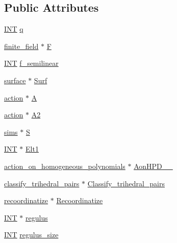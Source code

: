 \subsection*{Public Attributes}
\begin{DoxyCompactItemize}
\item 
\mbox{\hyperlink{galois_8h_a09fddde158a3a20bd2dcadb609de11dc}{I\+NT}} \mbox{\hyperlink{classsurface__with__action_ad76c0d129cee128327c4eb84b0943255}{q}}
\item 
\mbox{\hyperlink{classfinite__field}{finite\+\_\+field}} $\ast$ \mbox{\hyperlink{classsurface__with__action_ad9387d832b50fbcb93ca2cb84eec30a8}{F}}
\item 
\mbox{\hyperlink{galois_8h_a09fddde158a3a20bd2dcadb609de11dc}{I\+NT}} \mbox{\hyperlink{classsurface__with__action_a292234b69668cc2b04a3748a07d655fa}{f\+\_\+semilinear}}
\item 
\mbox{\hyperlink{classsurface}{surface}} $\ast$ \mbox{\hyperlink{classsurface__with__action_a28f1189bfbd4aeca4a38ea6e8dffdecc}{Surf}}
\item 
\mbox{\hyperlink{classaction}{action}} $\ast$ \mbox{\hyperlink{classsurface__with__action_a917c39611aca53009efb0cba5067de16}{A}}
\item 
\mbox{\hyperlink{classaction}{action}} $\ast$ \mbox{\hyperlink{classsurface__with__action_a3f56e203b7c502c7444cd3a25e43307f}{A2}}
\item 
\mbox{\hyperlink{classsims}{sims}} $\ast$ \mbox{\hyperlink{classsurface__with__action_aae9cc463b8b45bc730b746d2418c00a4}{S}}
\item 
\mbox{\hyperlink{galois_8h_a09fddde158a3a20bd2dcadb609de11dc}{I\+NT}} $\ast$ \mbox{\hyperlink{classsurface__with__action_a48da49b4e4eb51b1b23f5ac625dd772e}{Elt1}}
\item 
\mbox{\hyperlink{classaction__on__homogeneous__polynomials}{action\+\_\+on\+\_\+homogeneous\+\_\+polynomials}} $\ast$ \mbox{\hyperlink{classsurface__with__action_a7d9807f03ad5ae4f52d311daf339519b}{Aon\+H\+P\+D\+\_\+\_}}
\item 
\mbox{\hyperlink{classclassify__trihedral__pairs}{classify\+\_\+trihedral\+\_\+pairs}} $\ast$ \mbox{\hyperlink{classsurface__with__action_aa3df02c272e3f7e0ea2ae774a335927a}{Classify\+\_\+trihedral\+\_\+pairs}}
\item 
\mbox{\hyperlink{classrecoordinatize}{recoordinatize}} $\ast$ \mbox{\hyperlink{classsurface__with__action_a93f3d279e1fd3cd90ea6f258fb9470b3}{Recoordinatize}}
\item 
\mbox{\hyperlink{galois_8h_a09fddde158a3a20bd2dcadb609de11dc}{I\+NT}} $\ast$ \mbox{\hyperlink{classsurface__with__action_a70d65bc43edf131db6952ed0685f120d}{regulus}}
\item 
\mbox{\hyperlink{galois_8h_a09fddde158a3a20bd2dcadb609de11dc}{I\+NT}} \mbox{\hyperlink{classsurface__with__action_a3144f026aaf3cda6976ee6a0f6922481}{regulus\+\_\+size}}
\end{DoxyCompactItemize}



